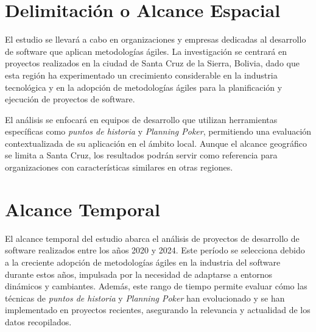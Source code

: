 \section{Delimitación o Alcance Espacial}

El estudio se llevará a cabo en organizaciones y empresas dedicadas al desarrollo de software que aplican metodologías ágiles. La investigación se centrará en proyectos realizados en la ciudad de Santa Cruz de la Sierra, Bolivia, dado que esta región ha experimentado un crecimiento considerable en la industria tecnológica y en la adopción de metodologías ágiles para la planificación y ejecución de proyectos de software. 

El análisis se enfocará en equipos de desarrollo que utilizan herramientas específicas como \textit{puntos de historia} y \textit{Planning Poker}, permitiendo una evaluación contextualizada de su aplicación en el ámbito local. Aunque el alcance geográfico se limita a Santa Cruz, los resultados podrán servir como referencia para organizaciones con características similares en otras regiones.

\section{Alcance Temporal}

El alcance temporal del estudio abarca el análisis de proyectos de desarrollo de software realizados entre los años 2020 y 2024. Este período se selecciona debido a la creciente adopción de metodologías ágiles en la industria del software durante estos años, impulsada por la necesidad de adaptarse a entornos dinámicos y cambiantes. Además, este rango de tiempo permite evaluar cómo las técnicas de \textit{puntos de historia} y \textit{Planning Poker} han evolucionado y se han implementado en proyectos recientes, asegurando la relevancia y actualidad de los datos recopilados.
